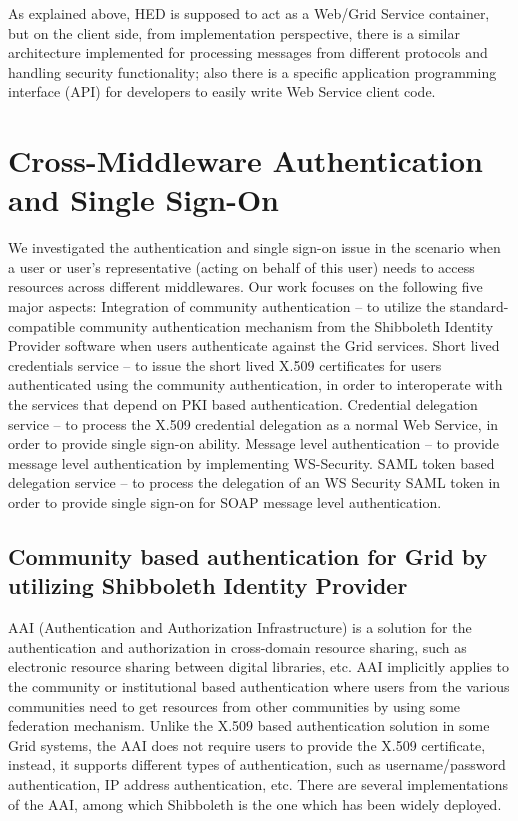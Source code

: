 As explained above, HED is supposed to act as a Web/Grid Service container, but on the client side, from implementation perspective, there is a similar architecture implemented for processing messages from different protocols and handling security functionality; also there is a specific application programming interface (API) for developers to easily write Web Service client code.


\section{Cross-Middleware Authentication and Single Sign-On}
\label{sec:siglesignon}
We investigated the authentication and single sign-on issue in the scenario when a user or user’s representative (acting on behalf of this user) needs to access resources across different middlewares. Our work focuses on the following five major aspects:
Integration of community authentication – to utilize the standard-compatible community authentication mechanism from the Shibboleth\cite{Shiblink} Identity Provider software when users authenticate against the Grid services.
Short lived credentials service – to issue the short lived X.509 certificates for users authenticated using the community authentication, in order to interoperate with the services that depend on PKI based authentication.
Credential delegation service – to process the X.509 credential delegation as a normal Web Service, in order to provide single sign-on ability.
Message level authentication – to provide message level authentication by implementing WS-Security.
SAML token based delegation service – to process the delegation of an WS Security SAML token in order to provide single sign-on for SOAP message level authentication.


\subsection{Community based authentication for Grid by utilizing Shibboleth Identity Provider}
\label{sec:communityauthn}
AAI (Authentication and Authorization Infrastructure) is a solution for the authentication and authorization in cross-domain resource sharing, such as electronic resource sharing between digital libraries, etc. AAI implicitly applies to the community or institutional based authentication where users from the various communities need to get resources from other communities by using some federation mechanism. Unlike the X.509 based authentication solution in some Grid systems, the AAI does not require users to provide the X.509 certificate, instead, it supports different types of authentication, such as username/password authentication, IP address authentication, etc. There are several implementations of the AAI, among which Shibboleth is the one which has been widely deployed.

